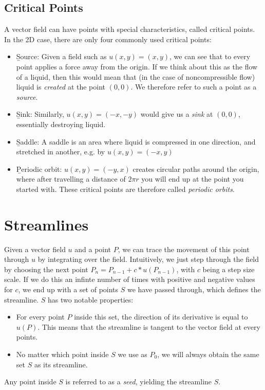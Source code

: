 \subsection{Critical Points}
A vector field can have points with special characteristics, called critical points.
In the 2D case, there are only four commonly used critical points:
\begin{itemize}
    \item \b{Source}:
    Given a field such as $u(x,y) = (x,y)$, we can see that to every point applies a force away from the origin.
    If we think about this as the flow of a liquid, then this would mean that (in the case of noncompressible flow) liquid is \textit{created} at the point $(0,0)$.
    We therefore refer to such a point as a \textit{source}.
    \item \b{Sink}:
    Similarly, $u(x,y) = (-x,-y)$ would give us a \textit{sink} at $(0,0)$, essentially destroying liquid.
    \item \b{Saddle}:
    A saddle is an area where liquid is compressed in one direction, and stretched in another, e.g. by $u(x,y) = (-x,y)$
    \item \b{Periodic orbit}:
    $u(x,y) = (-y,x)$ creates circular paths around the origin, where after travelling a distance of $2\pi r$ you will end up at the point you started with.
    These critical points are therefore called \textit{periodic orbits}.
\end{itemize}

\section{Streamlines}
Given a vector field $u$ and a point $P$, we can trace the movement of this point through $u$ by integrating over the field.
Intuitively, we just step through the field by choosing the next point $P_n = P_{n-1} + c * u(P_{n-1})$, with $c$ being a step size scale.
If we do this an infinte number of times with positive and negative values for $c$,
we end up with a set of points $S$ we have passed through, which defines the streamline.
$S$ has two notable properties:
\begin{itemize}
    \item For every point $P$ inside this set, the direction of its derivative is equal to $u(P)$.
    This means that the streamline is tangent to the vector field at every points.
    \item No matter which point inside $S$ we use as $P_0$, we will always obtain the same set $S$ as its streamline.
\end{itemize}
Any point inside $S$ is referred to as a \textit{seed}, yielding the streamline $S$.

